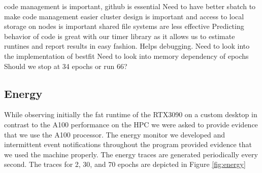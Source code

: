 \documentclass[utf8]{FrontiersinVancouver} %
\newcommand{\TODO}[1]{\todo[inline]{#1}}
\begin{document}
code management is important, github is essential
Need to have better sbatch to make code management easier
cluster design is important and access to local storage on nodes is important
shared file systems are less effective 
Predicting behavior of code is great with our timer library as it allows us to estimate runtines and report results in easy fashion. Helps debugging.
Need to look into the implementation of bestfit 
Need to look into memory dependency of epochs
Should we stop at 34 epochs or run 66?

\TODO{add k80 elsewhere}



\subsection{Energy}
\label{sec:perf-energy}


While observing initially the fat runtime of the RTX3090 on a custom
desktop in contrast to the A100 performance on the HPC we were asked
to provide evidence that we use the A100 processor. The energy monitor
we developed and intermittent event notifications throughout the
program provided evidence that we used the machine properly. The
energy traces are generated periodically every second. The traces for
2, 30, and 70 epochs are depicted in Figure \ref{fig:energy}
\end{document}
